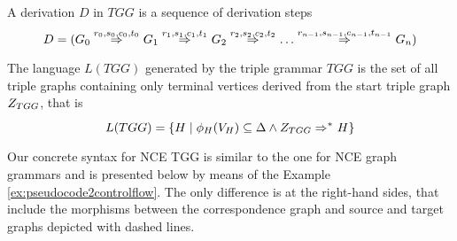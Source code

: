\documentclass[]{report}
\begin{document}

\begin{definition}
	A derivation $D$ in $TGG$ is a sequence of derivation steps
	\[ 
	D = (G_0 \tderiv{r_0}{s_0,c_0,t_0}{} G_1 \tderiv{r_1}{s_1,c_1,t_1}{} G_2 \tderiv{r_2}{s_2,c_2,t_2}{} \dots \tderiv{r_{n-1}}{s_{n-1},c_{n-1},t_{n-1}}{} G_n)
	\]
\end{definition}

\begin{definition}
	\label{def:tlanguage}
	The language $L(TGG)$ generated by the triple grammar $TGG$ is the set of all triple graphs containing only terminal vertices derived from the start triple graph $Z_{TGG}$, that is
	\[
	L(TGG) = \{H \st \phi_H(V_H) \subseteq \Delta \land \startTG{TGG} \tderivtr{}{}{} H\}
	\]
\end{definition}

Our concrete syntax for NCE TGG is similar to the one for NCE graph grammars and is presented below by means of the Example \ref{ex:pseudocode2controlflow}. The only difference is at the right-hand sides, that include the morphisms between the correspondence graph and source and target graphs depicted with dashed lines.
\end{document}
